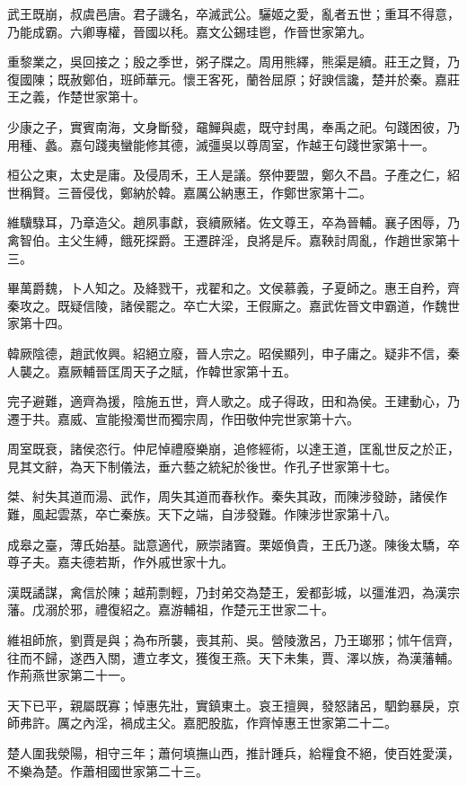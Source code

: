 \begin{pinyinscope}
武王既崩，叔虞邑唐。君子譏名，卒滅武公。驪姬之愛，亂者五世；重耳不得意，乃能成霸。六卿專權，晉國以秏。嘉文公錫珪鬯，作晉世家第九。

重黎業之，吳回接之；殷之季世，粥子牒之。周用熊繹，熊渠是續。莊王之賢，乃復國陳；既赦鄭伯，班師華元。懷王客死，蘭咎屈原；好諛信讒，楚并於秦。嘉莊王之義，作楚世家第十。

少康之子，實賓南海，文身斷發，黿鱓與處，既守封禺，奉禹之祀。句踐困彼，乃用種、蠡。嘉句踐夷蠻能修其德，滅彊吳以尊周室，作越王句踐世家第十一。

桓公之東，太史是庸。及侵周禾，王人是議。祭仲要盟，鄭久不昌。子產之仁，紹世稱賢。三晉侵伐，鄭納於韓。嘉厲公納惠王，作鄭世家第十二。

維驥騄耳，乃章造父。趙夙事獻，衰續厥緒。佐文尊王，卒為晉輔。襄子困辱，乃禽智伯。主父生縛，餓死探爵。王遷辟淫，良將是斥。嘉鞅討周亂，作趙世家第十三。

畢萬爵魏，卜人知之。及絳戮干，戎翟和之。文侯慕義，子夏師之。惠王自矜，齊秦攻之。既疑信陵，諸侯罷之。卒亡大梁，王假廝之。嘉武佐晉文申霸道，作魏世家第十四。

韓厥陰德，趙武攸興。紹絕立廢，晉人宗之。昭侯顯列，申子庸之。疑非不信，秦人襲之。嘉厥輔晉匡周天子之賦，作韓世家第十五。

完子避難，適齊為援，陰施五世，齊人歌之。成子得政，田和為侯。王建動心，乃遷于共。嘉威、宣能撥濁世而獨宗周，作田敬仲完世家第十六。

周室既衰，諸侯恣行。仲尼悼禮廢樂崩，追修經術，以達王道，匡亂世反之於正，見其文辭，為天下制儀法，垂六藝之統紀於後世。作孔子世家第十七。

桀、紂失其道而湯、武作，周失其道而春秋作。秦失其政，而陳涉發跡，諸侯作難，風起雲蒸，卒亡秦族。天下之端，自涉發難。作陳涉世家第十八。

成皋之臺，薄氏始基。詘意適代，厥崇諸竇。栗姬偩貴，王氏乃遂。陳後太驕，卒尊子夫。嘉夫德若斯，作外戚世家十九。

漢既譎謀，禽信於陳；越荊剽輕，乃封弟交為楚王，爰都彭城，以彊淮泗，為漢宗藩。戊溺於邪，禮復紹之。嘉游輔祖，作楚元王世家二十。

維祖師旅，劉賈是與；為布所襲，喪其荊、吳。營陵激呂，乃王瑯邪；怵午信齊，往而不歸，遂西入關，遭立孝文，獲復王燕。天下未集，賈、澤以族，為漢藩輔。作荊燕世家第二十一。

天下已平，親屬既寡；悼惠先壯，實鎮東土。哀王擅興，發怒諸呂，駟鈞暴戾，京師弗許。厲之內淫，禍成主父。嘉肥股肱，作齊悼惠王世家第二十二。

楚人圍我滎陽，相守三年；蕭何填撫山西，推計踵兵，給糧食不絕，使百姓愛漢，不樂為楚。作蕭相國世家第二十三。


\end{pinyinscope}
